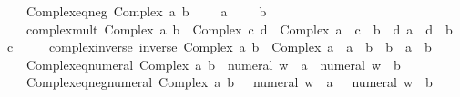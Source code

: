 \begin{isabellebody}
\ \ \ \ \ Complex{\isacharunderscore}{\kern0pt}eq{\isacharunderscore}{\kern0pt}neg{\isacharunderscore}{\kern0pt}{}{\isacharcolon}{\kern0pt}\ {\isachardoublequoteopen}Complex\ a\ b\ {\isacharequal}{\kern0pt}\ {\isacharminus}{\kern0pt}\ {}\ {\isasymlongleftrightarrow}\ a\ {\isacharequal}{\kern0pt}\ {\isacharminus}{\kern0pt}\ {}\ {\isasymand}\ b\ {\isacharequal}{\kern0pt}\ {}{\isachardoublequoteclose}\isanewline
\ \ \ \ \ complex{\isacharunderscore}{\kern0pt}mult{\isacharcolon}{\kern0pt}\ {\isachardoublequoteopen}Complex\ a\ b\ {\isacharasterisk}{\kern0pt}\ Complex\ c\ d\ {\isacharequal}{\kern0pt}\ Complex\ {\isacharparenleft}{\kern0pt}a\ {\isacharasterisk}{\kern0pt}\ c\ {\isacharminus}{\kern0pt}\ b\ {\isacharasterisk}{\kern0pt}\ d{\isacharparenright}{\kern0pt}\ {\isacharparenleft}{\kern0pt}a\ {\isacharasterisk}{\kern0pt}\ d\ {\isacharplus}{\kern0pt}\ b\ {\isacharasterisk}{\kern0pt}\ c{\isacharparenright}{\kern0pt}{\isachardoublequoteclose}\isanewline
\ \ \ \ \ complex{\isacharunderscore}{\kern0pt}inverse{\isacharcolon}{\kern0pt}\ {\isachardoublequoteopen}inverse\ {\isacharparenleft}{\kern0pt}Complex\ a\ b{\isacharparenright}{\kern0pt}\ {\isacharequal}{\kern0pt}\ Complex\ {\isacharparenleft}{\kern0pt}a\ {\isacharslash}{\kern0pt}\ {\isacharparenleft}{\kern0pt}a\ {\isacharplus}{\kern0pt}\ b\ {\isacharparenleft}{\kern0pt}{\isacharminus}{\kern0pt}\ b\ {\isacharslash}{\kern0pt}\ {\isacharparenleft}{\kern0pt}a\ {\isacharplus}{\kern0pt}\ b\isanewline
\ \ \ \ \ Complex{\isacharunderscore}{\kern0pt}eq{\isacharunderscore}{\kern0pt}numeral{\isacharcolon}{\kern0pt}\ {\isachardoublequoteopen}Complex\ a\ b\ {\isacharequal}{\kern0pt}\ numeral\ w\ {\isasymlongleftrightarrow}\ a\ {\isacharequal}{\kern0pt}\ numeral\ w\ {\isasymand}\ b\ {\isacharequal}{\kern0pt}\ {}{\isachardoublequoteclose}\isanewline
\ \ \ \ \ Complex{\isacharunderscore}{\kern0pt}eq{\isacharunderscore}{\kern0pt}neg{\isacharunderscore}{\kern0pt}numeral{\isacharcolon}{\kern0pt}\ {\isachardoublequoteopen}Complex\ a\ b\ {\isacharequal}{\kern0pt}\ {\isacharminus}{\kern0pt}\ numeral\ w\ {\isasymlongleftrightarrow}\ a\ {\isacharequal}{\kern0pt}\ {\isacharminus}{\kern0pt}\ numeral\ w\ {\isasymand}\ b\ {\isacharequal}{\kern0pt}\ {}{\isachardoublequoteclose}\isanewline

\end{isabellebody}
